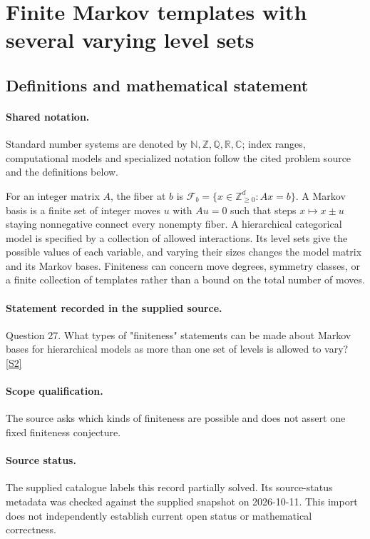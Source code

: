\documentclass[11pt]{article}
\newcommand{\sref}[2]{\hyperlink{source:#1:#2}{[S#2]}}
\begin{document}
\section{Finite Markov templates with several varying level sets}\label{statement}

\subsection{Definitions and mathematical statement}

\paragraph{Shared notation.}Standard number systems are denoted by $\mathbb N,\mathbb Z,\mathbb Q,\mathbb R,\mathbb C$; index ranges, computational models and specialized notation follow the cited problem source and the definitions below.


For an integer matrix $A$, the fiber at $b$ is $\mathcal F_b=\{x\in\mathbb Z_{\ge0}^d:Ax=b\}$. A Markov basis is a finite set of integer moves $u$ with $Au=0$ such that steps $x\mapsto x\pm u$ staying nonnegative connect every nonempty fiber. A hierarchical categorical model is specified by a collection of allowed interactions. Its level sets give the possible values of each variable, and varying their sizes changes the model matrix and its Markov bases. Finiteness can concern move degrees, symmetry classes, or a finite collection of templates rather than a bound on the total number of moves.
\paragraph{Statement recorded in the supplied source.}
Question 27. What types of "finiteness" statements can be made about Markov bases for hierarchical models as more than one set of levels is allowed to vary? \sref{statement}{2}
\paragraph{Scope qualification.}
The source asks which kinds of finiteness are possible and does not assert one fixed finiteness conjecture.
\paragraph{Source status.}
The supplied catalogue labels this record partially solved. Its source-status metadata was checked against the supplied snapshot on 2026-10-11. This import does not independently establish current open status or mathematical correctness.
\end{document}
